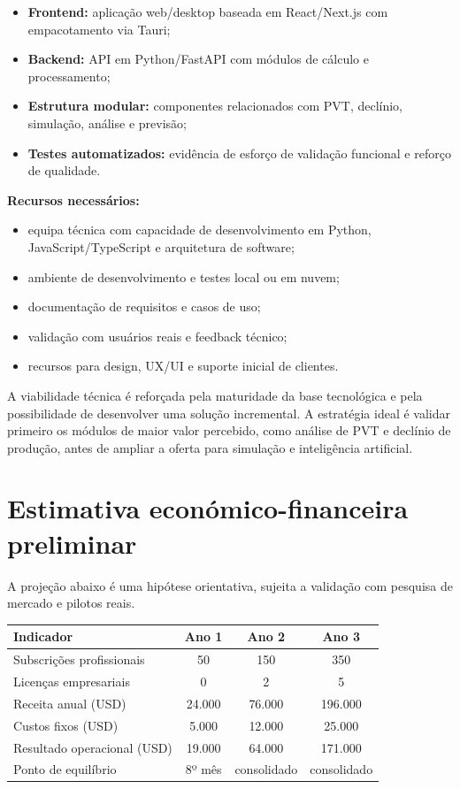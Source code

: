 \documentclass[11pt,a4paper]{article}
\begin{document}
\begin{itemize}
    \item \textbf{Frontend:} aplicação web/desktop baseada em React/Next.js com empacotamento via Tauri;
    \item \textbf{Backend:} API em Python/FastAPI com módulos de cálculo e processamento;
    \item \textbf{Estrutura modular:} componentes relacionados com PVT, declínio, simulação, análise e previsão;
    \item \textbf{Testes automatizados:} evidência de esforço de validação funcional e reforço de qualidade.
\end{itemize}

\textbf{Recursos necessários:}
\begin{itemize}
    \item equipa técnica com capacidade de desenvolvimento em Python, JavaScript/TypeScript e arquitetura de software;
    \item ambiente de desenvolvimento e testes local ou em nuvem;
    \item documentação de requisitos e casos de uso;
    \item validação com usuários reais e feedback técnico;
    \item recursos para design, UX/UI e suporte inicial de clientes.
\end{itemize}

A viabilidade técnica é reforçada pela maturidade da base tecnológica e pela possibilidade de desenvolver uma solução incremental. A estratégia ideal é validar primeiro os módulos de maior valor percebido, como análise de PVT e declínio de produção, antes de ampliar a oferta para simulação e inteligência artificial.

\section{Estimativa económico-financeira preliminar}
A projeção abaixo é uma hipótese orientativa, sujeita a validação com pesquisa de mercado e pilotos reais.

\begin{table}[H]
\centering
\small
\begin{tabularx}{\textwidth}{>{\raggedright\arraybackslash}X|c|c|c}
\toprule
\textbf{Indicador} & \textbf{Ano 1} & \textbf{Ano 2} & \textbf{Ano 3} \\
\midrule
Subscrições profissionais & 50 & 150 & 350 \\
Licenças empresariais & 0 & 2 & 5 \\
Receita anual (USD) & 24.000 & 76.000 & 196.000 \\
Custos fixos (USD) & 5.000 & 12.000 & 25.000 \\
Resultado operacional (USD) & 19.000 & 64.000 & 171.000 \\
Ponto de equilíbrio & 8º mês & consolidado & consolidado \\
\bottomrule
\end{tabularx}
\end{table}
\end{document}
